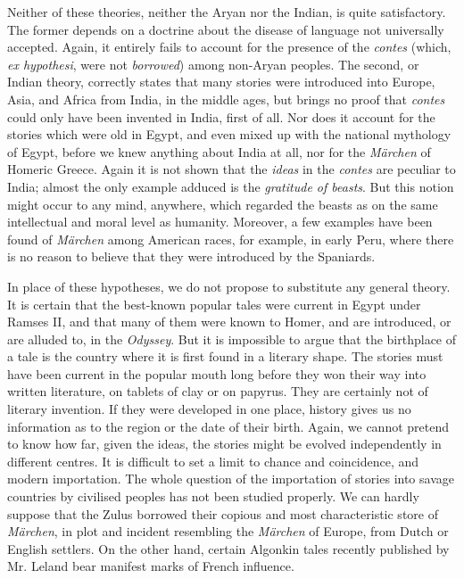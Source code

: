 \documentclass[14pt,a4paper]{memoir}
\begin{document}
{{Neither of these theories, neither the Aryan nor the Indian, is quite
satisfactory. The former depends on a doctrine about the
\textquotesingle disease of language\textquotesingle{} not universally
accepted. Again, it entirely fails to account for the presence of the
\emph{contes} (which, \emph{ex hypothesi}, were not \emph{borrowed})
among non-Aryan peoples. The second, or Indian theory, correctly states
that many stories were introduced into Europe, Asia, and Africa from
India, in the middle ages, but brings no proof that \emph{contes} could
only have been invented in India, first of all. Nor does it account for
the stories which were old in Egypt, and even mixed up with the national
mythology of Egypt, before we knew anything about India at all, nor for
the \emph{Märchen} of Homeric Greece. Again it is not shown that the
\emph{ideas} in the \emph{contes} are peculiar to India; almost the only
example adduced is the \emph{gratitude of beasts}. But this notion might
occur to any mind, anywhere, which regarded the beasts as on the same
intellectual and moral level as humanity. Moreover, a few examples have
been found of \emph{Märchen} among American races, for example, in early
Peru, where there is no reason to believe that they were introduced by
the
Spaniards.

In place of these hypotheses, we do not propose to substitute any
general theory. It is certain that the best-known popular tales were
current in Egypt under Ramses II, and that many of them were known to
Homer, and are introduced, or are alluded to, in the \emph{Odyssey}. But
it is impossible to argue that the birthplace of a tale is the country
where it is first found in a literary shape. The stories must have been
current in the popular mouth long before they won their way into written
literature, on tablets of clay or on papyrus. They are certainly not of
literary invention. If they were developed in one place, history gives
us no information as to the region or the date of their birth. Again, we
cannot pretend to know how far, given the ideas, the stories might be
evolved independently in different centres. It is difficult to set a
limit to chance and coincidence, and modern importation. The whole
question of the importation of stories into savage countries by
civilised peoples has not been studied properly. We can hardly suppose
that the Zulus borrowed their copious and most characteristic store of
\emph{Märchen}, in plot and incident resembling the \emph{Märchen} of
Europe, from Dutch or English settlers. On the other hand, certain
Algonkin tales recently published by Mr. Leland bear manifest marks of
French influence.

}}
\end{document}

